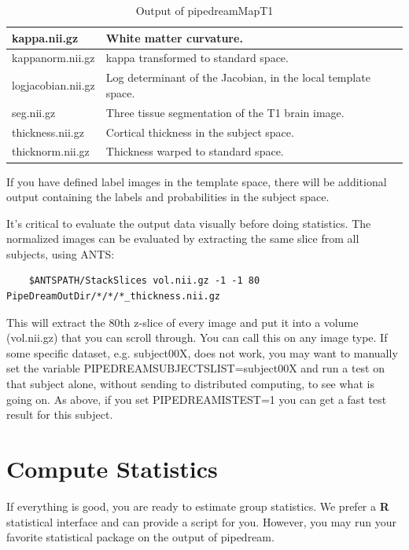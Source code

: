 \documentclass{InsightArticle}
\begin{document}
\begin{table}[htdp]
\begin{center}
\begin{tabular}{| p{5cm} | p{10cm} |}
kappa.nii.gz               & White matter curvature. \\ \hline
kappanorm.nii.gz   & kappa transformed to standard space. \\ \hline
logjacobian.nii.gz   & Log determinant of the Jacobian, in the local template space. \\ \hline
seg.nii.gz      & Three tissue segmentation of the T1 brain image.\\ \hline
thickness.nii.gz & Cortical thickness in the subject space. \\ \hline
thicknorm.nii.gz & Thickness warped to standard space. \\ \hline
\end{tabular}
\end{center}
\label{pipedreamMapT1out}
\caption{Output of pipedreamMapT1}
\end{table}%

If you have defined label images in the template space, there will be additional output containing the labels and probabilities in the subject space.

It's critical to evaluate the output data visually before doing statistics. The normalized images can be evaluated by extracting the same slice from all subjects, using ANTS:
\begin{verbatim}
    $ANTSPATH/StackSlices vol.nii.gz -1 -1 80  PipeDreamOutDir/*/*/*_thickness.nii.gz
\end{verbatim}
This will extract the 80th z-slice of every image and put it into a volume (vol.nii.gz) 
that you can scroll through.  You can call this on any image type.  If some specific dataset, e.g. subject00X, does not work, you 
may want to manually set the variable PIPEDREAMSUBJECTSLIST=subject00X and run a test 
on that subject alone, without sending to distributed computing, to see what is going on.  As above, if you 
set PIPEDREAMISTEST=1 you can get a fast test result for this subject.  

\section{Compute Statistics} 
If everything is good, you are ready to estimate group statistics.  We
prefer a {\bf R} statistical interface and can provide a script for
you.  However, you may run your favorite statistical package on the
output of pipedream.
\end{document}
